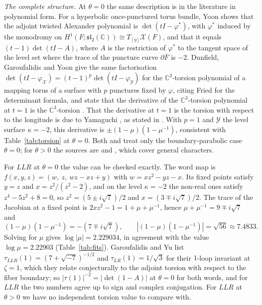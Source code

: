 \documentclass[11pt]{amsart}
\theoremstyle{definition}
\theoremstyle{remark}
\newcommand{\C}{\mathbb{C}}
\begin{document}
\emph{The complete structure.} At $\theta = 0$ the same description is in the
literature in polynomial form. For a hyperbolic once-punctured torus bundle, Yoon
\cite[proof of Thm.~4.11]{Yoon} shows that the adjoint twisted Alexander polynomial
is $\det(tI - \varphi^*)$, with $\varphi^*$ induced by the monodromy on
$H^1(F; \mathfrak{sl}_2(\C)) \cong T_{[\eta]}\mathcal{X}(F)$, and that it equals
$(t-1)\det(tI - A)$, where $A$ is the restriction of $\varphi^*$ to the tangent space
of the level set where the trace of the puncture curve $\partial\bar F$ is
$-2$. Dunfield, Garoufalidis and Yoon \cite[Thm.~3.2 and its proof, (29)--(31)]{DGY}
give the same factorisation $\det(tI - \varphi_{\mathcal X}) = (t-1)^p
\det(tI - \varphi_{\mathcal Y})$ for the $\C^3$-torsion polynomial of a mapping torus
of a surface with $p$ punctures fixed by $\varphi$, citing Fried for the determinant
formula, and state that the derivative of the $\C^3$-torsion polynomial at $t = 1$ is
the $\C^3$-torsion \cite[Section~1, after Thm.~1.2]{DGY}. That the derivative at
$t = 1$ is the torsion with respect to the longitude is due to Yamaguchi \cite{Yam},
as stated in \cite[(4) and Thm.~1.7]{GY21}. With $p = 1$ and $\mathcal Y$ the level
surface $\kappa = -2$, this derivative is $\pm(1-\mu)(1-\mu^{-1})$, consistent with
Table~\ref{tab:torsion} at $\theta = 0$. Both \cite{Yoon} and \cite{DGY} treat only
the boundary-parabolic case $\theta = 0$; for $\theta > 0$ the sources are
\cite[Prop.~5.9]{Porti} and \cite{Dub}, which cover general characters.

For $LLR$ at $\theta = 0$ the value can be checked exactly. The word map is
$f(x,y,z) = (w,\ z,\ wz - xz + y)$ with $w = xz^2 - yz - x$. Its fixed points satisfy
$y = z$ and $x = z^2/(z^2-2)$, and on the level $\kappa = -2$ the non-real ones satisfy
$z^4 - 5z^2 + 8 = 0$, so $z^2 = (5 \pm i\sqrt7)/2$ and $x = (3 \mp i\sqrt7)/2$. The
trace of the Jacobian at a fixed point is $2xz^2 - 1 = 1 + \mu + \mu^{-1}$, hence
$\mu + \mu^{-1} = 9 \mp i\sqrt7$ and
\[
(1-\mu)(1-\mu^{-1}) = -(7 \mp i\sqrt7), \qquad |(1-\mu)(1-\mu^{-1})| = \sqrt{56}
\approx 7.4833 .
\]
Solving for $\mu$ gives $\log|\mu| = 2.229034$, in agreement with the value
$\log\mu = 2.22903$ (Table~\ref{tab:fits}). Garoufalidis and Yu \cite{GY} list
$\tau_{LLR}(1) = (7 + \sqrt{-7})^{-1/2}$ and $\tau_{LR}(1) = 1/\sqrt3$ for their
$1$-loop invariant at $\zeta = 1$, which they relate conjecturally to the adjoint
torsion with respect to the fiber boundary; so $|\tau(1)|^{-2} = |\det(1 - A)|$ at
$\theta = 0$ for both words, and for $LLR$ the two numbers agree up to sign and
complex conjugation. For $LLR$ at $\theta > 0$ we have no independent torsion value to
compare with.
\end{document}
